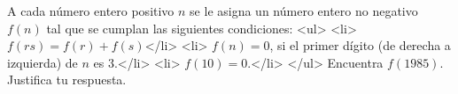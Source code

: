 A cada número entero positivo $n$ se le asigna un número entero no negativo $f(n)$ tal que se cumplan las siguientes condiciones:
<ul>
<li> $f(rs) = f(r)+f(s)$</li>
<li> $f(n) = 0$, si el primer dígito (de derecha a izquierda) de $n$ es 3.</li>
<li> $f(10) = 0$.</li>
</ul>
Encuentra $f(1985)$. Justifica tu respuesta.
